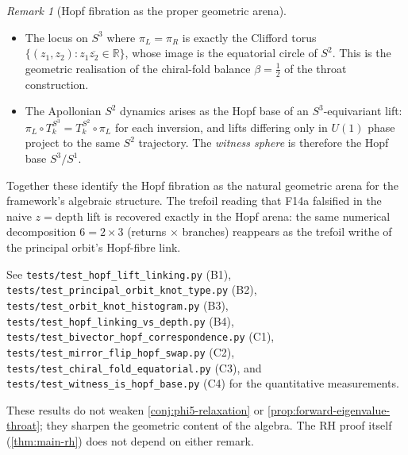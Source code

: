 \documentclass[11pt,a4paper]{article}
\theoremstyle{plain}
\theoremstyle{definition}
\theoremstyle{remark}
\newtheorem{remark}[theorem]{Remark}
\numberwithin{equation}{section}
\newcommand{\Cl}{\mathbb{G}}
\begin{document}
\begin{remark}[Hopf fibration as the proper geometric arena]
\begin{itemize}
  \((z_1,z_2)\mapsto(\overline{z_1},\overline{z_2})\) on \(S^3\)
  swaps the left-Hopf and right-Hopf fibrations exactly: this is
  the \(\Cl(3,1)\leftrightarrow\Cl(1,3)\) mirror flip realised
  geometrically.  Left-Hopf and right-Hopf fibres at distinct base
  points link with magnitude \(1\) (Hopf-chain unit linking
  between mirror partners).
\item The locus on \(S^3\) where \(\pi_L=\pi_R\) is exactly the
  Clifford torus \(\{(z_1,z_2):z_1\overline{z_2}\in\mathbb{R}\}\),
  whose image is the equatorial circle of \(S^2\).  This is the
  geometric realisation of the chiral-fold balance
  \(\beta=\tfrac12\) of the throat construction.
\item The Apollonian \(S^2\) dynamics arises as the Hopf base of an
  \(S^3\)-equivariant lift: \(\pi_L\circ T_k^{S^3}=T_k^{S^2}\circ\pi_L\)
  for each inversion, and lifts differing only in \(U(1)\) phase
  project to the same \(S^2\) trajectory.  The \emph{witness sphere}
  is therefore the Hopf base \(S^3/S^1\).
\end{itemize}
Together these identify the Hopf fibration as the natural geometric
arena for the framework's algebraic structure.  The trefoil reading
that F14a falsified in the naive \(z=\text{depth}\) lift is recovered
exactly in the Hopf arena: the same numerical decomposition
\(6=2\times 3\) (returns \(\times\) branches) reappears as the trefoil
writhe of the principal orbit's Hopf-fibre link.

\begin{sloppypar}
See \texttt{tests/}\allowbreak\texttt{test\_hopf\_lift\_linking.py} (B1),
\texttt{tests/}\allowbreak\texttt{test\_principal\_orbit\_knot\_type.py} (B2),
\texttt{tests/}\allowbreak\texttt{test\_orbit\_knot\_histogram.py} (B3),
\texttt{tests/}\allowbreak\texttt{test\_hopf\_linking\_vs\_depth.py} (B4),
\texttt{tests/}\allowbreak\texttt{test\_bivector\_hopf\_correspondence.py} (C1),
\texttt{tests/}\allowbreak\texttt{test\_mirror\_flip\_hopf\_swap.py} (C2),
\texttt{tests/}\allowbreak\texttt{test\_chiral\_fold\_equatorial.py} (C3), and
\texttt{tests/}\allowbreak\texttt{test\_witness\_is\_hopf\_base.py} (C4) for the
quantitative measurements.
\end{sloppypar}  These results do not weaken
\cref{conj:phi5-relaxation} or
\cref{prop:forward-eigenvalue-throat}; they sharpen the geometric
content of the algebra.  The RH proof itself
(\cref{thm:main-rh}) does not depend on either remark.
\end{remark}
\end{document}
